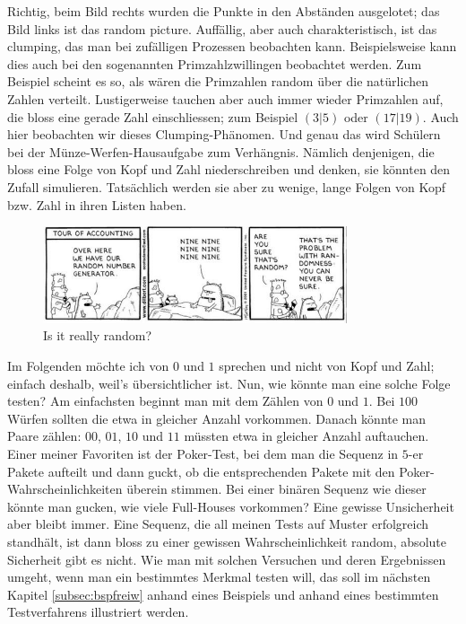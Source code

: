 \documentclass[%
11pt,%
twoside,%
titlepage,%
german,%
headsepline%
]{scrartcl}
\begin{document}
Richtig, beim Bild rechts wurden die Punkte in den Abständen ausgelotet; das Bild links ist das random picture. Auffällig, aber auch charakteristisch, ist das \glqq clumping\grqq, das man bei zufälligen Prozessen beobachten kann. Beispielsweise kann dies auch bei den sogenannten Primzahlzwillingen beobachtet werden. Zum Beispiel scheint es so, als wären die Primzahlen random über die natürlichen Zahlen verteilt. Lustigerweise tauchen aber auch immer wieder Primzahlen auf, die bloss eine gerade Zahl einschliessen; zum Beispiel $(3|5)$ oder $(17|19)$. Auch hier beobachten wir dieses Clumping-Phänomen. Und genau das wird Schülern bei der Münze-Werfen-Hausaufgabe zum Verhängnis. Nämlich denjenigen, die bloss eine Folge von Kopf und Zahl niederschreiben und denken, sie könnten den Zufall simulieren. Tatsächlich werden sie aber zu wenige, lange Folgen von Kopf bzw. Zahl in ihren Listen haben.

\begin{figure}
    \centering
    \includegraphics[width=0.8\textwidth]{pictures/randomgenerator.jpg}
    \caption{Is it really random?}
\end{figure}

Im Folgenden möchte ich von $0$ und $1$ sprechen und nicht von Kopf und Zahl; einfach deshalb, weil's übersichtlicher ist.
Nun, wie könnte man eine solche Folge testen? Am einfachsten beginnt man mit dem Zählen von $0$ und $1$. Bei $100$ Würfen sollten die etwa in gleicher Anzahl vorkommen. Danach könnte man Paare zählen: $00$, $01$, $10$ und $11$ müssten etwa in gleicher Anzahl auftauchen. Einer meiner Favoriten ist der Poker-Test, bei dem man die Sequenz in $5$-er Pakete aufteilt und dann guckt, ob die entsprechenden Pakete mit den Poker-Wahrscheinlichkeiten überein stimmen. Bei einer binären Sequenz wie dieser könnte man gucken, wie viele Full-Houses vorkommen? Eine gewisse Unsicherheit aber bleibt immer. Eine Sequenz, die all meinen Tests auf Muster erfolgreich standhält, ist dann bloss zu einer gewissen Wahrscheinlichkeit random, absolute Sicherheit gibt es nicht. Wie man mit solchen Versuchen und deren Ergebnissen umgeht, wenn man ein bestimmtes Merkmal testen will, das soll im nächsten Kapitel \ref{subsec:bspfreiw} anhand eines Beispiels und anhand eines bestimmten Testverfahrens illustriert werden.
\end{document}
